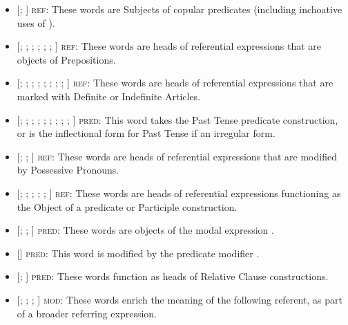 \begin{itemize}
  \singlespacing
  \item {[; ]} \textsc{ref:} These words are Subjects of copular predicates (including inchoative uses of ).
  \item {[; ; ; ; ; ; ]} \textsc{ref:} These words are heads of referential expressions that are objects of Prepositions.
  \item {[; ; ; ; ; ; ; ; ]} \textsc{ref:} These words are heads of referential expressions that are marked with Definite or Indefinite Articles.
  \item {[; ; ; ; ; ; ; ; ; ]} \textsc{pred:} This word takes the Past Tense  predicate construction, or is the inflectional form for Past Tense if an irregular form.
  \item {[; ; ]} \textsc{ref:} These words are heads of referential expressions that are modified by Possessive Pronouns.
  \item {[; ; ; ; ; ]} \textsc{ref:} These words are heads of referential expressions functioning as the Object of a predicate or Participle construction.
  \item {[; ; ]} \textsc{pred:} These words are objects of the modal expression .
  \item {[]} \textsc{pred:} This word is modified by the predicate modifier .
  \item {[; ]} \textsc{pred:} These words function as heads of Relative Clause constructions.
  \item {[; ; ; ]} \textsc{mod:} These words enrich the meaning of the following referent, as part of a broader referring expression.

\end{itemize}

